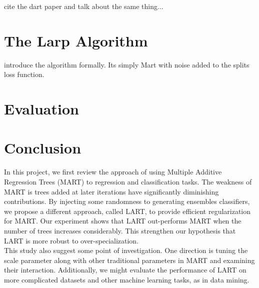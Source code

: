 \documentclass{article} %
\begin{document}
cite the dart paper and talk about the same thing...

\section{The Larp Algorithm}

introduce the algorithm formally. Its simply Mart with noise added to the splits loss function.

\section{Evaluation}

\section{Conclusion}
In this project, we first review the approach of using Multiple Additive Regression Trees (MART) to regression and classification tasks. The weakness of MART is trees added at later iterations have significantly diminishing contributions. By injecting some randomness to generating ensembles classifiers, we propose a different approach, called LART, to provide efficient regularization for MART. Our experiment shows that LART out-performs MART when the number of trees increases considerably. This strengthen our hypothesis that LART is more robust to over-specialization.\\

This study also suggest some point of investigation. One direction is tuning the scale parameter along with other traditional parameters in MART and examining their interaction. Additionally, we might evaluate the performance of LART on more complicated datasets and other machine learning tasks, as in data mining.



\nocite{*}


\end{document}
